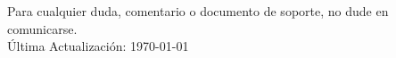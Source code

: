 \documentclass[]{friggeri-cv}
\begin{document}
\newline
\newline
\newline
Para cualquier duda, comentario o documento de soporte, no dude en comunicarse.\\
Última Actualización: \today
% 
\end{document}
